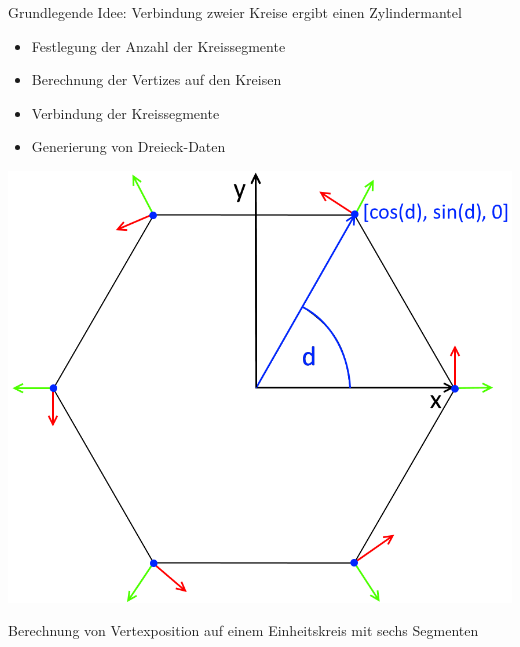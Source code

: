 \begin{description}
	\item Grundlegende Idee: Verbindung zweier Kreise ergibt einen Zylindermantel
 
	\begin{itemize}
		\item Festlegung der Anzahl der Kreissegmente\\
		
		\item Berechnung der Vertizes auf den Kreisen\\
		
		\item Verbindung der Kreissegmente\\
		
		\item Generierung von Dreieck-Daten
	\end{itemize}
\end{description}




\newpage
\begin{center}
	\includegraphics[height=.9\textheight]{images/CH4_Ring6Sections.png}
	
	Berechnung von Vertexposition auf einem Einheitskreis mit sechs Segmenten
\end{center}




